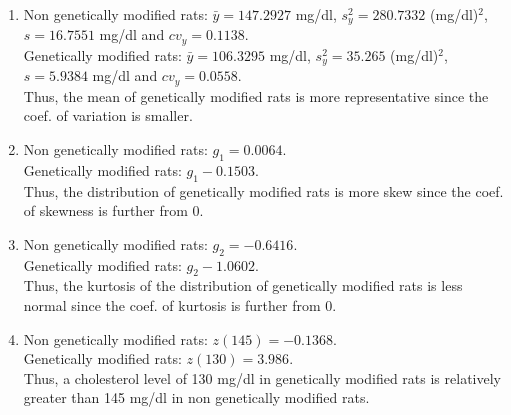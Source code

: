 {\begin{enumerate}
\item Non genetically modified rats: $\bar y=147.2927$ mg/dl,  $s^2_y=280.7332$ (mg/dl)$^2$, $s=16.7551$ mg/dl and $cv_y=0.1138$.\\
Genetically modified rats: $\bar y=106.3295$ mg/dl,  $s^2_y=35.265$ (mg/dl)$^2$, $s=5.9384$ mg/dl and $cv_y=0.0558$.\\
Thus, the mean of genetically modified rats is more representative since the coef. of variation is smaller.
\item Non genetically modified rats: $g_1=0.0064$.\\
Genetically modified rats: $g_1-0.1503$.\\
Thus, the distribution of genetically modified rats is more skew since the coef. of skewness is further from 0.
\item Non genetically modified rats: $g_2=-0.6416$.\\
Genetically modified rats: $g_2-1.0602$.\\
Thus, the kurtosis of the distribution of genetically modified rats is less normal since the coef. of kurtosis is further from 0.
\item Non genetically modified rats: $z(145)=-0.1368$.\\
Genetically modified rats: $z(130)=3.986$.\\
Thus, a cholesterol level of 130 mg/dl in genetically modified rats is relatively greater than 145 mg/dl in non genetically modified rats.
\end{enumerate}
}
{
}